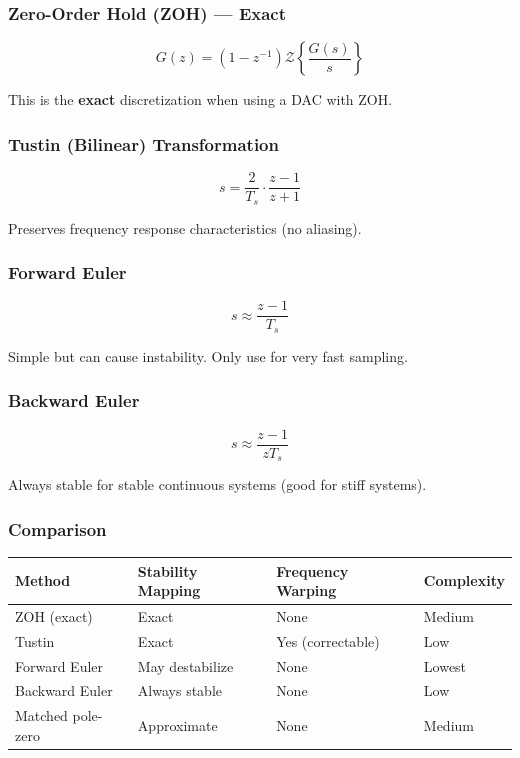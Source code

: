 \documentclass[11pt,a4paper]{book}
\begin{document}
\subsubsection{Zero-Order Hold (ZOH) — Exact}

\[G(z) = (1 - z^{-1}) \mathcal{Z}\left\{\frac{G(s)}{s}\right\}\]

This is the \textbf{exact} discretization when using a DAC with ZOH.

\subsubsection{Tustin (Bilinear) Transformation}

\[s = \frac{2}{T_s} \cdot \frac{z-1}{z+1}\]

Preserves frequency response characteristics (no aliasing).

\subsubsection{Forward Euler}

\[s \approx \frac{z-1}{T_s}\]

Simple but can cause instability. Only use for very fast sampling.

\subsubsection{Backward Euler}

\[s \approx \frac{z-1}{zT_s}\]

Always stable for stable continuous systems (good for stiff systems).

\subsubsection{Comparison}

\begin{center}
\begin{tabular}{|l|l|l|l|}
\hline
Method & Stability Mapping & Frequency Warping & Complexity \\
\hline
ZOH (exact) & Exact & None & Medium \\
Tustin & Exact & Yes (correctable) & Low \\
Forward Euler & May destabilize & None & Lowest \\
Backward Euler & Always stable & None & Low \\
Matched pole-zero & Approximate & None & Medium \\
\hline
\end{tabular}
\end{center}
\end{document}
